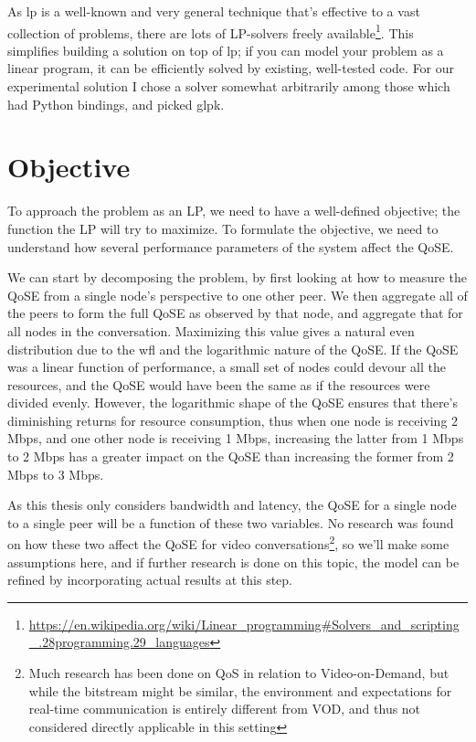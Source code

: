 As \gls{lp} is a well-known and very general technique that's effective to a vast collection of problems, there are lots of LP-solvers freely available\footnote{\url{https://en.wikipedia.org/wiki/Linear_programming\#Solvers_and_scripting_.28programming.29_languages}}. This simplifies building a solution on top of \gls{lp}; if you can model your problem as a linear program, it can be efficiently solved by existing, well-tested code. For our experimental solution I chose a solver somewhat arbitrarily among those which had Python bindings, and picked \gls{glpk}.


\section{Objective}

To approach the problem as an LP, we need to have a well-defined objective; the function the LP will try to maximize. To formulate the objective, we need to understand how several performance parameters of the system affect the QoSE.

We can start by decomposing the problem, by first looking at how to measure the QoSE from a single node's perspective to one other peer. We then aggregate all of the peers to form the full QoSE as observed by that node, and aggregate that for all nodes in the conversation. Maximizing this value gives a natural even distribution due to the \gls{wfl} and the logarithmic nature of the QoSE. If the QoSE was a linear function of performance, a small set of nodes could devour all the resources, and the QoSE would have been the same as if the resources were divided evenly. However, the logarithmic shape of the QoSE ensures that there's diminishing returns for resource consumption, thus when one node is receiving 2 Mbps, and one other node is receiving 1 Mbps, increasing the latter from 1 Mbps to 2 Mbps has a greater impact on the QoSE than increasing the former from 2 Mbps to 3 Mbps.

As this thesis only considers bandwidth and latency, the QoSE for a single node to a single peer will be a function of these two variables. No research was found on how these two affect the QoSE for video conversations\footnote{Much research has been done on QoS in relation to Video-on-Demand, but while the bitstream might be similar, the environment and expectations for real-time communication is entirely different from VOD, and thus not considered directly applicable in this setting}, so we'll make some assumptions here, and if further research is done on this topic, the model can be refined by incorporating actual results at this step.

